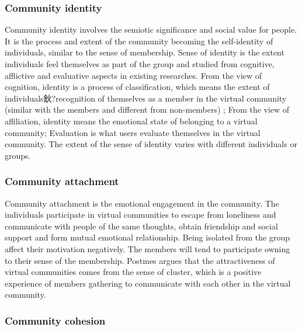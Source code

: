 \documentclass[doublespacing]{elsarticle}
\begin{document}
\subsubsection{Community identity}
\label{sec:community-identiy}

Community identity involves the semiotic significance and social value
for people. It is the process and extent of the community becoming the
self-identity of individuals, similar to the sense of
membership. Sense of identity is the extent individuals feel
themselves as part of the group and studied from cognitive, afflictive
and evaluative aspects in existing
researches\cite{dholakia2004241}. From the view of cognition, identity
is a process of classification, which means the extent of
individuals鈥?recognition of themselves as a member in the virtual
community (similar with the members and different from non-members) ; From the view of affiliation, identity means the emotional state of belonging to a virtual community; Evaluation is what users evaluate themselves in the virtual community. The extent of the sense of identity varies with different individuals or groups\cite{warren1972ca}.     

\subsubsection{Community attachment}
\label{sec:community-attachment}

Community attachment is the emotional engagement in the community. The
individuals participate in virtual communities to escape from
loneliness and communicate with people of the same thoughts, obtain
friendship and social support and  form mutual emotional relationship.
Being isolated from the group affect their motivation negatively. The members will tend to participate owning to their sense of the membership. Postmes argues that the attractiveness of virtual communities comes from the sense of cluster, which is a positive experience of members gathering  to communicate with each other in the virtual community\cite{t_postmes_formation_2000}.     

\subsubsection{Community cohesion}
\label{sec:community-cohesion}
\end{document}
